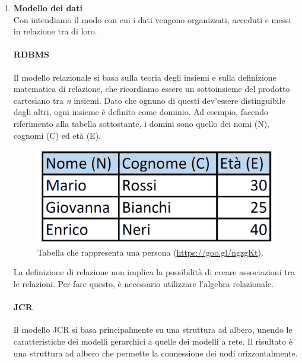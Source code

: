 		\begin{enumerate}
			\item \textbf{Modello dei dati} \\
			Con  intendiamo il modo con cui i dati vengono organizzati, acceduti e messi in relazione tra di loro.
			\paragraph{RDBMS} 
			Il modello relazionale si basa sulla teoria degli insiemi e sulla definizione matematica di relazione, che ricordiamo essere un sottoinsieme del prodotto cartesiano tra \textit{n} insiemi. Dato che ognuno di questi dev'essere distinguibile dagli altri, ogni insieme è definito come dominio. Ad esempio, facendo riferimento alla tabella sottostante, i domini sono quello dei nomi (N), cognomi (C) ed età (E). 
			
			\begin{figure}[H]
				\centering
				\includegraphics[scale=0.2]{immagini/modello-r}
				\caption{Tabella che rappresenta una persona (\url{https://goo.gl/ngzgKt}).}
			\end{figure}
		
			La definizione di relazione non implica la possibilità di creare associazioni tra le relazioni. Per fare questo, è necessario utilizzare l'algebra relazionale. 
			
			\paragraph{JCR} 
			Il modello JCR si basa principalmente su una struttura ad albero, unendo le caratteristiche dei modelli gerarchici a quelle dei modelli a rete. Il risultato è una struttura ad albero che permette la connessione dei nodi orizzontalmente.
			

\end{enumerate}
